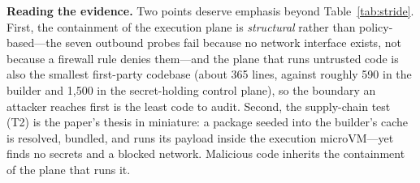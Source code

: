 \textbf{Reading the evidence.} Two points deserve emphasis beyond Table~\ref{tab:stride}.
First, the containment of the execution plane is \emph{structural} rather than
policy-based---the seven outbound probes fail because no network interface exists, not
because a firewall rule denies them---and the plane that runs untrusted code is also the
smallest first-party codebase (about 365 lines, against roughly 590 in the builder and
1{,}500 in the secret-holding control plane), so the boundary an attacker reaches first is
the least code to audit. Second, the supply-chain test (T2) is the paper's thesis in
miniature: a package seeded into the builder's cache is resolved, bundled, and runs its
payload inside the execution microVM---yet finds no secrets and a blocked network. Malicious
code inherits the containment of the plane that runs it.

